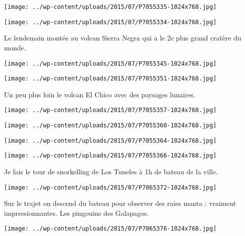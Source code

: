  \newline
 \newline
\centerline{\texttt{[image: ../wp-content/uploads/2015/07/P7055335-1024x768.jpg]} } 
 \newline
 \newline
\centerline{\texttt{[image: ../wp-content/uploads/2015/07/P7055334-1024x768.jpg]} } 
 \newline
 Le lendemain montée au volcan Sierra Negra qui a le 2e plus grand cratère du monde. \newline
 \newline
\centerline{\texttt{[image: ../wp-content/uploads/2015/07/P7055345-1024x768.jpg]} } 
 \newline
 \newline
\centerline{\texttt{[image: ../wp-content/uploads/2015/07/P7055351-1024x768.jpg]} } 
 \newline
 Un peu plus loin le volcan El Chico avec des paysages lunaires. \newline
 \newline
\centerline{\texttt{[image: ../wp-content/uploads/2015/07/P7055357-1024x768.jpg]} } 
 \newline
 \newline
\centerline{\texttt{[image: ../wp-content/uploads/2015/07/P7055360-1024x768.jpg]} } 
 \newline
 \newline
\centerline{\texttt{[image: ../wp-content/uploads/2015/07/P7055364-1024x768.jpg]} } 
 \newline
 \newline
\centerline{\texttt{[image: ../wp-content/uploads/2015/07/P7055366-1024x768.jpg]} } 
 \newline
 Je fais le tour de snorkelling de Los Tuneles à 1h de bateau de la ville. \newline
 \newline
\centerline{\texttt{[image: ../wp-content/uploads/2015/07/P7065372-1024x768.jpg]} } 
 \newline
 Sur le trajet on descend du bateau pour observer des raies manta : vraiment impressionnantes. \newline
 Les pingouins des Galapagos. \newline
 \newline
\centerline{\texttt{[image: ../wp-content/uploads/2015/07/P7065376-1024x768.jpg]} } 
 \newline

